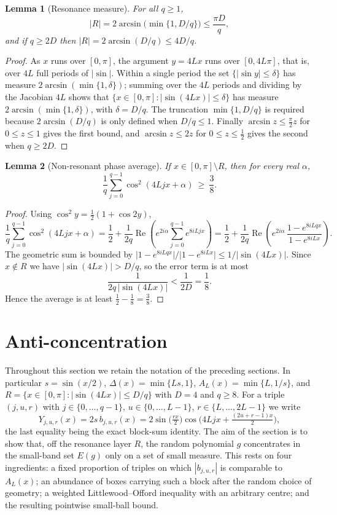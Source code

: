 \documentclass[11pt,reqno]{amsart}
\theoremstyle{plain}
\newtheorem{lemma}{Lemma}
\theoremstyle{definition}
\theoremstyle{remark}
\begin{document}
\begin{lemma}[Resonance measure]\label{lem:res-measure}
For all $q\ge 1$,
\[
|R|=2\arcsin\bigl(\min\{1,D/q\}\bigr)\le \frac{\pi D}{q},
\]
and if $q\ge 2D$ then $|R|=2\arcsin(D/q)\le 4D/q$.
\end{lemma}

\begin{proof}
As $x$ runs over $[0,\pi]$, the argument $y=4Lx$ runs over $[0,4L\pi]$, that is, over $4L$ full periods of $|\sin|$. Within a single period the set $\{|\sin y|\le\delta\}$ has measure $2\arcsin(\min\{1,\delta\})$; summing over the $4L$ periods and dividing by the Jacobian $4L$ shows that $\{x\in[0,\pi]:|\sin(4Lx)|\le\delta\}$ has measure $2\arcsin(\min\{1,\delta\})$, with $\delta=D/q$. The truncation $\min\{1,D/q\}$ is required because $2\arcsin(D/q)$ is only defined when $D/q\le 1$. Finally $\arcsin z\le\tfrac{\pi}{2}z$ for $0\le z\le 1$ gives the first bound, and $\arcsin z\le 2z$ for $0\le z\le\tfrac12$ gives the second when $q\ge 2D$.
\end{proof}

\begin{lemma}[Non-resonant phase average]\label{lem:phase-average}
If $x\in[0,\pi]\setminus R$, then for every real $\alpha$,
\[
\frac{1}{q}\sum_{j=0}^{q-1}\cos^2(4Ljx+\alpha)\ \ge\ \frac{3}{8}.
\]
\end{lemma}

\begin{proof}
Using $\cos^2 y=\tfrac12(1+\cos 2y)$,
\[
\frac{1}{q}\sum_{j=0}^{q-1}\cos^2(4Ljx+\alpha)
=\frac12+\frac{1}{2q}\operatorname{Re}\!\left(e^{2i\alpha}\sum_{j=0}^{q-1}e^{8iLjx}\right)
=\frac12+\frac{1}{2q}\operatorname{Re}\!\left(e^{2i\alpha}\,\frac{1-e^{8iLqx}}{1-e^{8iLx}}\right).
\]
The geometric sum is bounded by $\bigl|1-e^{8iLqx}\bigr|/\bigl|1-e^{8iLx}\bigr|\le 1/|\sin(4Lx)|$. Since $x\notin R$ we have $|\sin(4Lx)|>D/q$, so the error term is at most
\[
\frac{1}{2q\,|\sin(4Lx)|}<\frac{1}{2D}=\frac18.
\]
Hence the average is at least $\tfrac12-\tfrac18=\tfrac38$.
\end{proof}

\section{Anti-concentration}

Throughout this section we retain the notation of the preceding sections. In particular $s=\sin(x/2)$, $\Delta(x)=\min\{Ls,1\}$, $A_L(x)=\min\{L,1/s\}$, and $R=\{x\in[0,\pi]:|\sin(4Lx)|\le D/q\}$ with $D=4$ and $q\ge 8$. For a triple $(j,u,r)$ with $j\in\{0,\dots,q-1\}$, $u\in\{0,\dots,L-1\}$, $r\in\{L,\dots,2L-1\}$ we write
\[
Y_{j,u,r}(x)=2s\,b_{j,u,r}(x)=2\sin\!\Big(\tfrac{rx}{2}\Big)\cos\!\Big(4Ljx+\tfrac{(2u+r-1)x}{2}\Big),
\]
the last equality being the exact block-sum identity. The aim of the section is to show that, off the resonance layer $R$, the random polynomial $g$ concentrates in the small-band set $E(g)$ only on a set of small measure. This rests on four ingredients: a fixed proportion of triples on which $|b_{j,u,r}|$ is comparable to $A_L(x)$; an abundance of boxes carrying such a block after the random choice of geometry; a weighted Littlewood--Offord inequality with an arbitrary centre; and the resulting pointwise small-ball bound.
\end{document}
